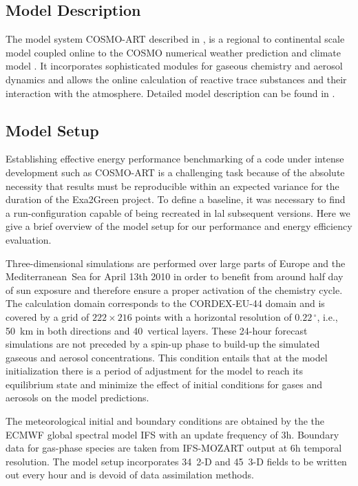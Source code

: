 \subsection{Model Description}
\label{subsec:1.1}
The  model  system COSMO-ART  described  in  \citep{Vogel-2009}, is  a
regional  to  continental scale  model  coupled  online  to the  COSMO
numerical weather  prediction and climate  model \citep{Baldauf-2011}.
It  incorporates  sophisticated  modules  for  gaseous  chemistry  and
aerosol dynamics  and allows the online calculation  of reactive trace
substances and their interaction  with the atmosphere.  Detailed model
description   can  be   found   in  \citep{Bangert-2012,   Knote-2011,
  Knote-2013}.

\subsection{Model Setup}
\label{subsec:1.2}
Establishing effective energy performance benchmarking of a code under
intense development such as COSMO-ART is a challenging task because of
the  absolute necessity that  results must  be reproducible  within an
expected variance for the duration of the Exa2Green project. To define
a baseline,  it was necessary  to find a run-configuration  capable of
being  recreated in  lal subsequent  versions.  Here  we give  a brief
overview of the model setup  for our performance and energy efficiency
evaluation.

Three-dimensional simulations are performed over large parts of Europe
and the Mediterranean~Sea for April 13th 2010 in order to benefit from
around  half  day  of  sun  exposure and  therefore  ensure  a  proper
activation of the chemistry cycle.  The calculation domain corresponds
to the CORDEX-EU-44 domain and is covered by a grid of $222\times 216$
points with  a horizontal resolution of $0.22\,^{\circ}$,  i.e.,  50~km
in  both directions and  40~vertical  layers.  These  24-hour forecast
simulations  are not  preceded  by  a spin-up  phase  to build-up  the
simulated gaseous and  aerosol concentrations.  This condition entails
that at the  model initialization there is a  period of adjustment for
the model  to reach its equilibrium  state and minimize  the effect of
initial conditions for gases and aerosols on the model predictions.

The meteorological initial and  boundary conditions are obtained by the
the ECMWF  global spectral model IFS  with an update  frequency of 3h.
Boundary data  for gas-phase species are taken  from IFS-MOZART output
at 6h temporal resolution. The  model setup incorporates 34~2-D and
45~3-D  fields  to be  written  out  every hour  and  is  devoid of  data
assimilation methods.

